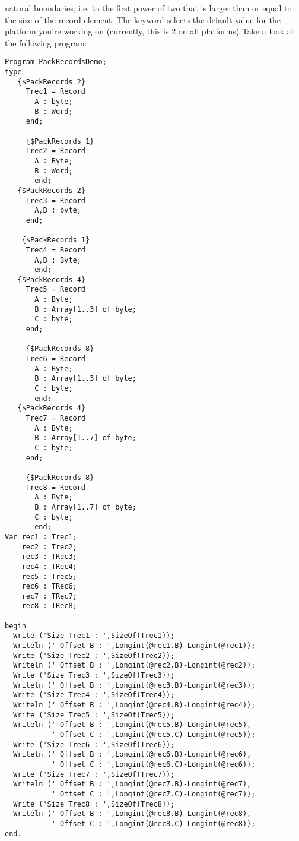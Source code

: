 \documentclass{report}
\begin{document}
natural boundaries, i.e. to the first power of two that is larger than or
equal to the size of the record element.
The keyword  selects the default value for the platform
you're working on (currently, this is 2 on all platforms)
Take a look at the following program:
\begin{verbatim}
Program PackRecordsDemo;
type
   {$PackRecords 2}
     Trec1 = Record
       A : byte;
       B : Word;
     end;

     {$PackRecords 1}
     Trec2 = Record
       A : Byte;
       B : Word;
       end;
   {$PackRecords 2}
     Trec3 = Record
       A,B : byte;
     end;

    {$PackRecords 1}
     Trec4 = Record
       A,B : Byte;
       end;
   {$PackRecords 4}
     Trec5 = Record
       A : Byte;
       B : Array[1..3] of byte;
       C : byte;
     end;

     {$PackRecords 8}
     Trec6 = Record
       A : Byte;
       B : Array[1..3] of byte;
       C : byte;
       end;
   {$PackRecords 4}
     Trec7 = Record
       A : Byte;
       B : Array[1..7] of byte;
       C : byte;
     end;

     {$PackRecords 8}
     Trec8 = Record
       A : Byte;
       B : Array[1..7] of byte;
       C : byte;
       end;
Var rec1 : Trec1;
    rec2 : Trec2;
    rec3 : TRec3;
    rec4 : TRec4;
    rec5 : Trec5;
    rec6 : TRec6;
    rec7 : TRec7;
    rec8 : TRec8;

begin
  Write ('Size Trec1 : ',SizeOf(Trec1));
  Writeln (' Offset B : ',Longint(@rec1.B)-Longint(@rec1));
  Write ('Size Trec2 : ',SizeOf(Trec2));
  Writeln (' Offset B : ',Longint(@rec2.B)-Longint(@rec2));
  Write ('Size Trec3 : ',SizeOf(Trec3));
  Writeln (' Offset B : ',Longint(@rec3.B)-Longint(@rec3));
  Write ('Size Trec4 : ',SizeOf(Trec4));
  Writeln (' Offset B : ',Longint(@rec4.B)-Longint(@rec4));
  Write ('Size Trec5 : ',SizeOf(Trec5));
  Writeln (' Offset B : ',Longint(@rec5.B)-Longint(@rec5),
           ' Offset C : ',Longint(@rec5.C)-Longint(@rec5));
  Write ('Size Trec6 : ',SizeOf(Trec6));
  Writeln (' Offset B : ',Longint(@rec6.B)-Longint(@rec6),
           ' Offset C : ',Longint(@rec6.C)-Longint(@rec6));
  Write ('Size Trec7 : ',SizeOf(Trec7));
  Writeln (' Offset B : ',Longint(@rec7.B)-Longint(@rec7),
           ' Offset C : ',Longint(@rec7.C)-Longint(@rec7));
  Write ('Size Trec8 : ',SizeOf(Trec8));
  Writeln (' Offset B : ',Longint(@rec8.B)-Longint(@rec8),
           ' Offset C : ',Longint(@rec8.C)-Longint(@rec8));
end.
\end{verbatim}
\end{document}
